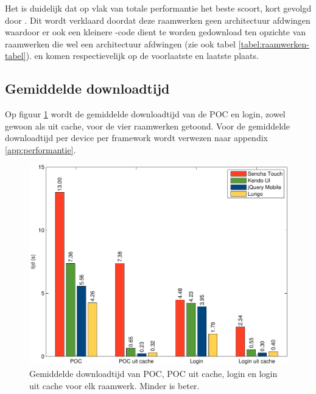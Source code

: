 Het is duidelijk dat op vlak van totale performantie \jqm{} het beste scoort, kort gevolgd door \lungo{}.
Dit wordt verklaard doordat deze raamwerken geen architectuur afdwingen waardoor er ook een kleinere \js{}-code dient te worden gedownload ten opzichte van raamwerken die wel een architectuur afdwingen (zie ook tabel \ref{tabel:raamwerken-tabel}).
\kendo{} en \st{} komen respectievelijk op de voorlaatste en laatste plaats.


\subsection{Gemiddelde downloadtijd}
\label{sec:evaluatie-downloadtijd}

Op figuur \ref{fig:performantie} wordt de gemiddelde downloadtijd van de POC en login, zowel gewoon als uit cache, voor de vier raamwerken getoond.
Voor de gemiddelde downloadtijd per device per framework wordt verwezen naar appendix \ref{app:performantie}.

\begin{figure}[H]
  \centering
  \includegraphics[width=\textwidth]{figuren/performance.pdf}
  \caption{Gemiddelde downloadtijd van POC,  POC uit cache,  login en login uit cache voor elk raamwerk. Minder is beter.}
  \label{fig:performantie}
\end{figure}

